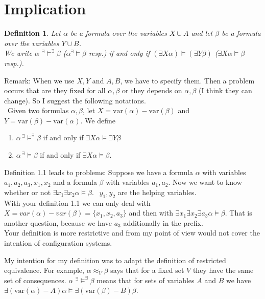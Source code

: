 \documentclass[12pt]{article}
\newcommand{\AM}{\mbox{$^\exists\!\!\models$}}
\newcommand{\AMB}{\mbox{$^\exists\!\!\models^\exists$}}
\newtheorem{definition}{Definition}[section]
\begin{document}
\section{Implication}
\begin{definition}
Let $\alpha$ be a formula over the variables $X \cup A$ and let $\beta$ be a formula over the variables $Y \cup B$.\\
We write $\alpha $ \AMB $\beta$ ($\alpha $\AM $\beta$ resp.) if and only if
$(\exists X \alpha) \models (\exists Y \beta)$ ($\exists X \alpha \models \beta$ resp.).
\end{definition}

\color{red}
\noindent Remark: When we use $X,Y$ and $A, B$, we have to specify them. Then a problem occurs that are they fixed for all $\alpha, \beta$ or they depends on $\alpha, \beta$ (I think they can change). So I suggest the following notations.\\

\ 
Given two formulas $\alpha,\beta$, let $X=\mbox{var}(\alpha)-\mbox{var}(\beta)$ and $Y=\mbox{var}(\beta)-\mbox{var}(\alpha)$. We define
\begin{enumerate}
\item $\alpha\, ^\exists\!\!\models^\exists \beta$ if and only if $\exists X\alpha\models \exists Y\beta$

\item $\alpha\, ^\exists\!\!\models \beta$ if and only if $\exists X \alpha\models \beta$.
\end{enumerate}
\color{blue}
Definition 1.1 leads to problems: Suppose we have a formula $\alpha$ with variables $a_1, a_2, a_3, x_1, x_2$ and a formula $\beta$ with variables $a_1, a_2$. Now we want to know whether or not $\exists x_1 \exists x_2 \alpha \models \beta$. $\ \ y_1,y_2$ are the helping variables.\\
With your definition 1.1 we can only deal with $X= var(\alpha) - var(\beta) = \{x_1, x_2, a_3\}$ and then
with
$\exists x_1 \exists  x_2 \exists a_3 \alpha \models \beta$. That is another question, because we have $a_3$ additionally in the prefix.\\
Your definition is more restrictive and from my point of view would not cover the intention of configuration systems.

My intention for my definition was to adapt the definition of restricted equivalence. For example, $\alpha \approx_{V}
\beta$ says that for a fixed set $V$ they have the same set of consequences. $\alpha$ \AMB $\beta$ means that for sets of
variables $A$ and $B$ we have $\exists (\mbox{var}(\alpha) - A) \alpha \models \exists (\mbox{var}(\beta) - B) \beta$.
\color{black}
\end{document}
